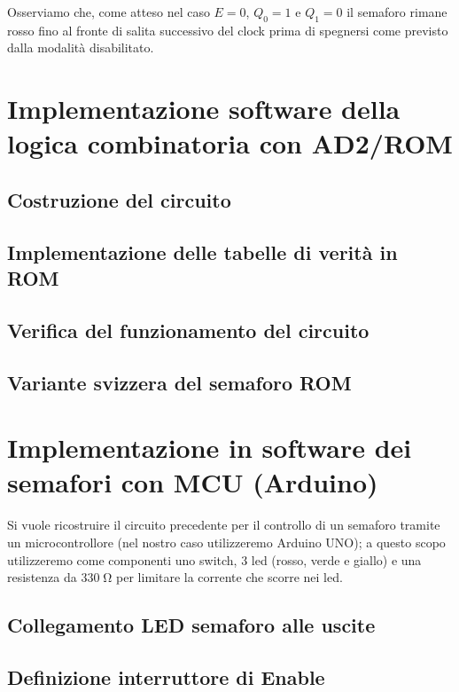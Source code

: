 \documentclass[10pt, a4paper, italian]{article}
\begin{document}
Osserviamo che, come atteso nel caso $E = 0$, $Q_0 = 1$ e $Q_1 = 0$ il
semaforo rimane rosso fino al fronte di salita successivo del clock prima
di spegnersi come previsto dalla modalità disabilitato.

\section{Implementazione software della logica combinatoria con AD2/ROM}
\subsection{Costruzione del circuito}

\subsection{Implementazione delle tabelle di verità in ROM}

\subsection{Verifica del funzionamento del circuito}

\subsection{Variante svizzera del semaforo ROM}

\section{Implementazione in software dei semafori con MCU (Arduino)}
Si vuole ricostruire il circuito precedente per il controllo di un semaforo tramite un microcontrollore (nel nostro caso utilizzeremo Arduino UNO); a questo scopo utilizzeremo come componenti uno switch, 3 led (rosso, verde e giallo) e una resistenza da
$330 \; \si{\ohm}$ per limitare la corrente che scorre nei led.

\subsection{Collegamento LED semaforo alle uscite}

\subsection{Definizione interruttore di Enable}
\end{document}
